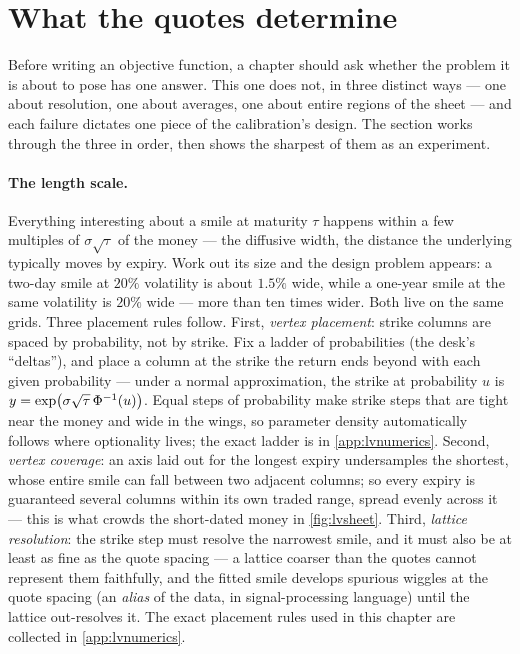 \section{What the quotes determine}
\label{sec:lvinfo}

Before writing an objective function, a chapter should ask whether the
problem it is about to pose has one answer.  This one does not, in
three distinct ways --- one about resolution, one about averages, one
about entire regions of the sheet --- and each failure dictates one
piece of the calibration's design.  The section works through the
three in order, then shows the sharpest of them as an experiment.

\paragraph{The length scale.}
Everything interesting about a smile at maturity $\tau$ happens within
a few multiples of $\sigma\sqrt{\tau}$ of the money --- the diffusive
width, the distance the underlying typically moves by expiry.  Work
out its size and the design problem appears: a two-day smile at $20\%$
volatility is about $1.5\%$ wide, while a one-year smile at the same
volatility is $20\%$ wide --- more than ten times wider.  Both live on
the same grids.  Three placement rules follow.  First, \emph{vertex
placement}: strike columns are spaced by probability, not by strike.
Fix a ladder of probabilities (the desk's ``deltas''), and place a
column at the strike the return ends beyond with each given
probability --- under a normal approximation, the strike at
probability $u$ is $y=\exp\!\big(\sigma\sqrt{\tau}\,\Phi^{-1}(u)\big)$.
Equal steps of probability make strike steps that are tight near the
money and wide in the wings, so parameter density automatically
follows where optionality lives; the exact ladder is in
\cref{app:lvnumerics}.  Second, \emph{vertex coverage}: an axis laid
out for the longest expiry undersamples the shortest, whose entire
smile can fall between two adjacent columns; so every expiry is
guaranteed several columns within its own traded range, spread evenly
across it --- this is what crowds the short-dated money in
\cref{fig:lvsheet}.  Third, \emph{lattice resolution}: the strike step
must resolve the narrowest smile, and it must also be at least as fine
as the quote spacing --- a lattice coarser than the quotes cannot
represent them faithfully, and the fitted smile develops spurious
wiggles at the quote spacing (an \emph{alias} of the data, in
signal-processing language) until the lattice out-resolves it.  The exact placement rules used in
this chapter are collected in \cref{app:lvnumerics}.

